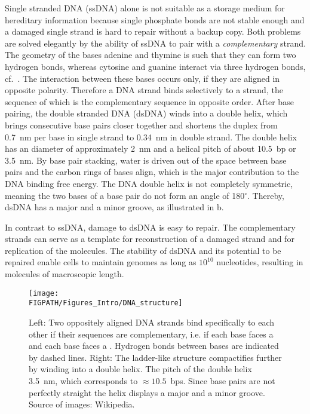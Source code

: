 Single stranded DNA (ssDNA) alone is not suitable as a storage medium for hereditary information 
because single phosphate bonds are not stable enough and a damaged single strand is hard to repair without a backup copy.
Both problems are solved elegantly by the ability of ssDNA to pair with a 
\emph{complementary} strand. The geometry of the bases 
adenine and thymine is such that they can form two hydrogen bonds, whereas
cytosine and guanine interact via three hydrogen bonds, cf.~. 
The interaction between these bases occurs only, if they are aligned in opposite 
polarity. Therefore a DNA strand binds 
selectively to a strand, the sequence of which is the complementary sequence in opposite
order. After base pairing, the double stranded DNA (dsDNA) winds into a double helix, which brings consecutive
base pairs closer together and shortens the duplex from 0.7~nm per base in single strand
to 0.34~nm in double strand. The double helix has an diameter of approximately 2~nm and a
helical pitch of about 10.5~bp or 3.5~nm. By base pair stacking, water
is driven out of the space between base pairs and the carbon rings of bases align, which 
is the major contribution to the DNA binding free energy. The DNA double helix is not completely
symmetric, meaning the two bases of a base pair do not form an angle of 180${}^\circ$. 
Thereby, dsDNA has a major and a minor groove, as illustrated in b.
%

In contrast to ssDNA, damage to dsDNA is easy to repair. 
The complementary strands can serve as a template for reconstruction of a damaged strand
and for replication of the molecules. The stability of dsDNA and its potential to be repaired
enable cells to maintain genomes as long as $10^{10}$ nucleotides, resulting in molecules of 
macroscopic length.
\begin{figure}
\centering
  \texttt{[image: \\FIGPATH/Figures\_Intro/DNA\_structure]}
\caption[Structure of dsDNA]{\label{fig:DNA_structure} Left: Two oppositely aligned DNA strands
bind specifically to each other if their sequences are complementary, i.e. if
each base  faces a  and each base  faces a . Hydrogen bonds
between bases are indicated by dashed lines. 
Right: The ladder-like structure compactifies further by winding into a double helix.
The pitch of the double helix 3.5~nm, which corresponds to $\approx 10.5$~bps. 
Since base pairs are not perfectly straight the helix displays a major and a minor groove.   
Source of images: Wikipedia.}
\end{figure}


